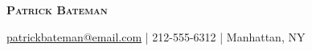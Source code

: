 \begin{center}
\textbf{\LARGE\scshape{Patrick Bateman}}
\end{center}

\vspace{-20pt}

\begin{center}
    \href{mailto:patrickbateman@email.com}{patrickbateman@email.com} | 212-555-6312 | Manhattan, NY
\end{center}